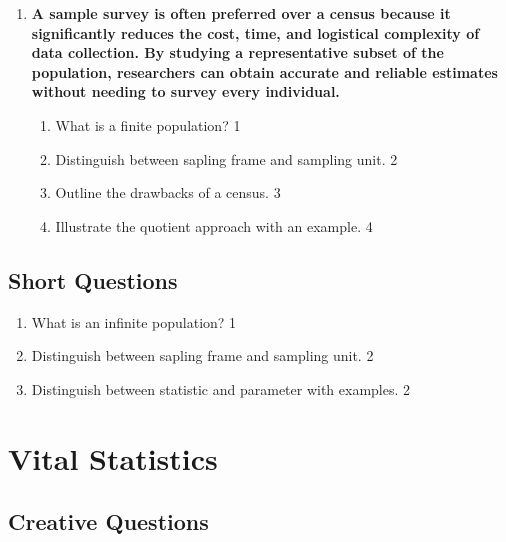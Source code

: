 \documentclass[a4paper,oneside]{book}
\begin{document}
\begin{enumerate}
\begin{enumerate}
    \item  
	Outline the steps in a sample survey. \hfill 3
    \item
	Illustrate the remainder approach with an example. \hfill 4
  \end{enumerate}
  
 \item
  \textbf{A sample survey is often preferred over a census because it significantly reduces the cost, time, and logistical complexity of data collection. By studying a representative subset of the population, researchers can obtain accurate and reliable estimates without needing to survey every individual.}

  
  \begin{enumerate}
    \item
	What is a finite population? \hfill 1
    \item
	Distinguish between sapling frame and sampling unit. \hfill 2

    \item  
	Outline the drawbacks of a census. \hfill 3
    \item
	Illustrate the quotient approach with an example. \hfill 4
  \end{enumerate}
    
  
  \end{enumerate}
\section{Short Questions}

 \begin{enumerate}
	\item What is an infinite population? \hfill 1
	\item Distinguish between sapling frame and sampling unit. \hfill 2
	\item Distinguish between statistic and parameter with examples. \hfill 2
 \end{enumerate}
\chapter{Vital Statistics} 
\section{Creative Questions}
\end{document}
